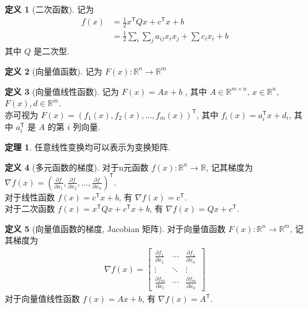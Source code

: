 \documentclass{article}
\theoremstyle{definition}
\newtheorem{definition}{定义}[section]
\theoremstyle{theorem}
\newtheorem{theorem}{定理}[section]
\newcommand{\Reals}{\mathbb{R}}
\begin{document}
\begin{definition}[二次函数] 记为
\begin{align*}
f(x) &= \frac{1}{2} x^\mathsf{T}Qx + c^\mathsf{T}x + b \\
     &= \frac{1}{2} \sum_i \sum_j a_{ij} x_i x_j + \sum c_i x_i + b
\end{align*}
其中 \( Q \) 是二次型.
\end{definition}

\begin{definition}[向量值函数] 记为
\( F(x) :\Reals^n \rightarrow \Reals^m \)
\end{definition}

\begin{definition}[向量值线性函数] 记为
\( F(x) = A x + b \) , 其中 \( A \in \Reals^{m \times n} \), \( x \in \Reals^n \), \( F(x), d \in \Reals^m \). \\
亦可视为 \( F(x) = (f_1(x), f_2(x), ..., f_m(x))^\mathsf{T} \), 其中 \( f_i(x) = a_i^\mathsf{T} x + d_i \), 其中 \( a_i^\mathsf{T} \) 是 \( A \) 的第 \( i \) 列向量.
\end{definition}

\begin{theorem}
任意线性变换均可以表示为变换矩阵.
\end{theorem}

\begin{definition}[多元函数的梯度] 对于n元函数 \( f(x): \Reals^n \rightarrow \Reals \), 记其梯度为
\( \nabla f(x) = (\frac{\partial f}{\partial x_1}, \frac{\partial f}{\partial x_2}, \dots, \frac{\partial f}{\partial x_n})^\mathsf{T} \). \\
对于线性函数 \( f(x) = c^\mathsf{T} x + b \), 有 \( \nabla f(x) = c^\mathsf{T} \). \\
对于二次函数 \( f(x) = x^\mathsf{T} Qx + c^\mathsf{T} x + b \), 有 \( \nabla f(x) = Qx +  c^\mathsf{T} \).
\end{definition}

\begin{definition}[向量值函数的梯度, Jacobian 矩阵] 对于向量值函数 \( F(x) :\Reals^n \rightarrow \Reals^m \), 记其梯度为
\begin{align*}
\nabla f(x) = \begin{bmatrix}
  \frac{\partial f_1}{\partial x_1} & \cdots & \frac{\partial f_1}{\partial x_n} \\
  \vdots                            & \ddots & \vdots                            \\
  \frac{\partial f_m}{\partial x_1} & \cdots & \frac{\partial f_m}{\partial x_n} 
\end{bmatrix}
\end{align*}
对于向量值线性函数 \( f(x) = Ax + b \), 有 \( \nabla f(x) = A^\mathsf{T} \).
\end{definition}
\end{document}
